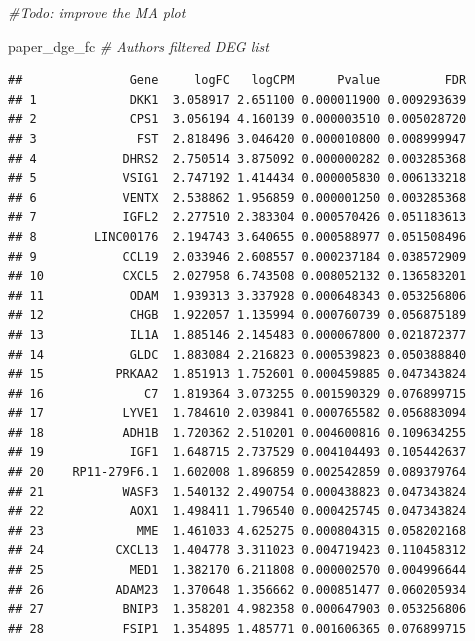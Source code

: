 \documentclass[
]{article}
\newenvironment{Shaded}{\begin{snugshade}}{\end{snugshade}}
\newcommand{\CommentTok}[1]{\textcolor[rgb]{0.56,0.35,0.01}{\textit{#1}}}
\newcommand{\NormalTok}[1]{#1}
\begin{document}
\begin{Shaded}
\begin{Highlighting}[]
\CommentTok{\#Todo: improve the MA plot}
\end{Highlighting}
\end{Shaded}

\begin{Shaded}
\begin{Highlighting}[]
\NormalTok{paper\_dge\_fc }\CommentTok{\# Authors\textquotesingle{} filtered DEG list}
\end{Highlighting}
\end{Shaded}

\begin{verbatim}
##               Gene     logFC   logCPM      Pvalue         FDR
## 1             DKK1  3.058917 2.651100 0.000011900 0.009293639
## 2             CPS1  3.056194 4.160139 0.000003510 0.005028720
## 3              FST  2.818496 3.046420 0.000010800 0.008999947
## 4            DHRS2  2.750514 3.875092 0.000000282 0.003285368
## 5            VSIG1  2.747192 1.414434 0.000005830 0.006133218
## 6            VENTX  2.538862 1.956859 0.000001250 0.003285368
## 7            IGFL2  2.277510 2.383304 0.000570426 0.051183613
## 8        LINC00176  2.194743 3.640655 0.000588977 0.051508496
## 9            CCL19  2.033946 2.608557 0.000237184 0.038572909
## 10           CXCL5  2.027958 6.743508 0.008052132 0.136583201
## 11            ODAM  1.939313 3.337928 0.000648343 0.053256806
## 12            CHGB  1.922057 1.135994 0.000760739 0.056875189
## 13            IL1A  1.885146 2.145483 0.000067800 0.021872377
## 14            GLDC  1.883084 2.216823 0.000539823 0.050388840
## 15          PRKAA2  1.851913 1.752601 0.000459885 0.047343824
## 16              C7  1.819364 3.073255 0.001590329 0.076899715
## 17           LYVE1  1.784610 2.039841 0.000765582 0.056883094
## 18           ADH1B  1.720362 2.510201 0.004600816 0.109634255
## 19            IGF1  1.648715 2.737529 0.004104493 0.105442637
## 20    RP11-279F6.1  1.602008 1.896859 0.002542859 0.089379764
## 21           WASF3  1.540132 2.490754 0.000438823 0.047343824
## 22            AOX1  1.498411 1.796540 0.000425745 0.047343824
## 23             MME  1.461033 4.625275 0.000804315 0.058202168
## 24          CXCL13  1.404778 3.311023 0.004719423 0.110458312
## 25            MED1  1.382170 6.211808 0.000002570 0.004996644
## 26          ADAM23  1.370648 1.356662 0.000851477 0.060205934
## 27           BNIP3  1.358201 4.982358 0.000647903 0.053256806
## 28           FSIP1  1.354895 1.485771 0.001606365 0.076899715

\end{verbatim}
\end{document}
